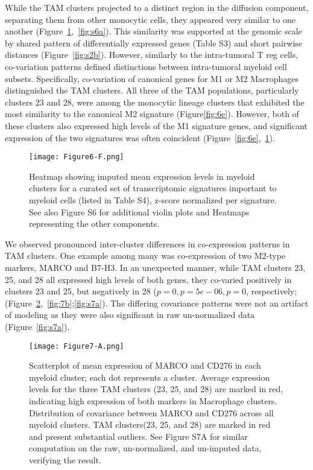 While the TAM clusters projected to a distinct region in the diffusion component, separating them from other monocytic cells, they appeared very similar to one another (Figure~\ref{fig:6f},~\ref{fig:s6a}).
This similarity was supported at the genomic scale by shared pattern of differentially expressed genes (Table S3) and short pairwise distances (Figure~\ref{fig:s2b}). %
However, similarly to the intra-tumoral T reg cells, co-variation patterns defined distinctions between intra-tumoral myeloid cell subsets.
Specifically, co-variation of canonical genes for M1 or M2 Macrophages distinguished the TAM clusters.
All three of the TAM populations, particularly clusters 23 and 28, were among the monocytic lineage clusters that exhibited the most similarity to the canonical M2 signature (Figure\ref{fig:6e}).
However, both of these clusters also expressed high levels of the M1 signature genes, and significant expression of the two signatures was often coincident (Figure~\ref{fig:6e},~\ref{fig:6f}).

\begin{figure}
\centering
\texttt{[image: Figure6-F.png]}
\caption{Heatmap showing imputed mean expression levels in myeloid clusters for a curated set of transcriptomic signatures important to myeloid cells (listed in Table S4), z-score normalized per signature.
See also Figure S6 for additional violin plots and Heatmaps representing the other components. %
}
\label{fig:6f}
\end{figure}

We observed pronounced inter-cluster differences in co-expression patterns in TAM clusters.
One example among many was co-expression of two M2-type markers, MARCO and B7-H3.
In an unexpected manner, while TAM clusters 23, 25, and 28 all expressed high levels of both genes, they co-varied positively in clusters 23 and 25, but negatively in 28 ($p=0, p=5e-06, p=0$, respectively; (Figure~\ref{fig:7a},~\ref{fig:7b};\ref{fig:s7a}).
The differing covariance patterns were not an artifact of modeling as they were also significant in raw un-normalized data (Figure~\ref{fig:s7a}).

\begin{figure}
\centering
\texttt{[image: Figure7-A.png]}
\caption{Scatterplot of mean expression of MARCO and CD276 in each myeloid cluster; each dot represents a cluster.
  Average expression levels for the three TAM clusters (23, 25, and 28) are marked in red, indicating high expression of both markers in Macrophage clusters.
Distribution of covariance between MARCO and CD276 across all myeloid clusters.
TAM clusters(23, 25, and 28) are marked in red and present substantial outliers.
See Figure S7A for similar computation on the raw, un-normalized, and un-imputed data, verifying the result.
}
\label{fig:7a}
\end{figure}

